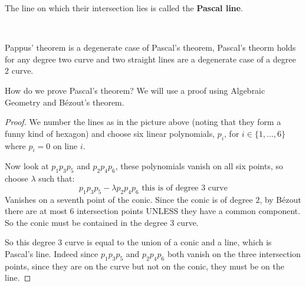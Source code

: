 The line on which their intersection lies is called the \textbf{Pascal line}.

\

Pappus' theorem is a degenerate case of Pascal's theorem, Pascal's theorm holds for any degree two curve and two straight lines are a degenerate case of a degree 2 curve.

How do we prove Pascal's theorem? We will use a proof using Algebraic Geometry and Bézout's theorem. 

\begin{proof}
    We number the lines as in the picture above (noting that they form a funny kind of hexagon) and choose six linear polynomials, 
    $p_i$, for $i\in \{1,\dots, 6\}$ where $p_i = 0$ on line $i$.

    Now look at $p_1p_3p_5$ and $p_2p_4p_6$, these polynomials vanish on all six points, so choose $\lambda$ such that:\begin{equation}
        p_1p_3p_5 - \lambda p_2p_4p_6 \text{ this is of degree 3 curve}
    \end{equation}
    Vanishes on a seventh point of the conic. Since the conic is of degree $2$, by Bézout there are at most $6$ intersection points 
    UNLESS they have a common component. So the conic must be contained in the degree $3$ curve.

    So this degree $3$ curve is equal to the union of a conic and a line, which is Pascal's line. Indeed since $p_1p_3p_5$ and $p_2p_4p_6$ both vanish on the 
    three intersection points, since they are on the curve but not on the conic, they must be on the line.
\end{proof}

